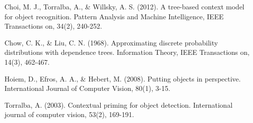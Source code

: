 \documentclass[11pt]{article}
\begin{document}
\begin{thebibliography}{2}
 Choi, M. J., Torralba, A., \& Willsky, A. S. (2012). A tree-based context model for object recognition. Pattern Analysis and Machine Intelligence, IEEE Transactions on, 34(2), 240-252.

Chow, C. K., \& Liu, C. N. (1968). Approximating discrete probability distributions with dependence trees. Information Theory, IEEE Transactions on, 14(3), 462-467.

Hoiem, D., Efros, A. A., \& Hebert, M. (2008). Putting objects in perspective. International Journal of Computer Vision, 80(1), 3-15.

Torralba, A. (2003). Contextual priming for object detection. International journal of computer vision, 53(2), 169-191.
\end{thebibliography}
\end{document}
